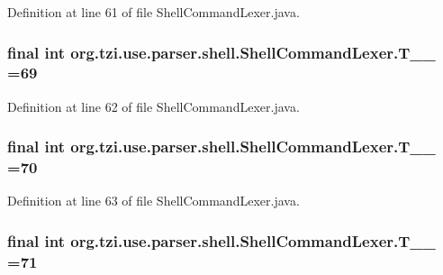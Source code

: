 Definition at line 61 of file Shell\-Command\-Lexer.\-java.

\hypertarget{classorg_1_1tzi_1_1use_1_1parser_1_1shell_1_1_shell_command_lexer_ac7916f55adc45f0b67008fd003557fd6}{
\subsubsection[{T\-\_\-\-\_\-69}]{\setlength{\rightskip}{0pt plus 5cm}final int org.\-tzi.\-use.\-parser.\-shell.\-Shell\-Command\-Lexer.\-T\-\_\-\-\_ =69\hspace{0.3cm}{\ttfamily [static]}}}\label{classorg_1_1tzi_1_1use_1_1parser_1_1shell_1_1_shell_command_lexer_ac7916f55adc45f0b67008fd003557fd6}


Definition at line 62 of file Shell\-Command\-Lexer.\-java.

\hypertarget{classorg_1_1tzi_1_1use_1_1parser_1_1shell_1_1_shell_command_lexer_a9f41498fb4340ad2469109d44132c97f}{
\subsubsection[{T\-\_\-\-\_\-70}]{\setlength{\rightskip}{0pt plus 5cm}final int org.\-tzi.\-use.\-parser.\-shell.\-Shell\-Command\-Lexer.\-T\-\_\-\-\_ =70\hspace{0.3cm}{\ttfamily [static]}}}\label{classorg_1_1tzi_1_1use_1_1parser_1_1shell_1_1_shell_command_lexer_a9f41498fb4340ad2469109d44132c97f}


Definition at line 63 of file Shell\-Command\-Lexer.\-java.

\hypertarget{classorg_1_1tzi_1_1use_1_1parser_1_1shell_1_1_shell_command_lexer_a0ec18bc536fca4d78912046e57d5f077}{
\subsubsection[{T\-\_\-\-\_\-71}]{\setlength{\rightskip}{0pt plus 5cm}final int org.\-tzi.\-use.\-parser.\-shell.\-Shell\-Command\-Lexer.\-T\-\_\-\-\_ =71\hspace{0.3cm}{\ttfamily [static]}}}\label{classorg_1_1tzi_1_1use_1_1parser_1_1shell_1_1_shell_command_lexer_a0ec18bc536fca4d78912046e57d5f077}


